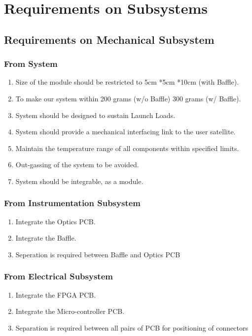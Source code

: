 \documentclass[../../main.tex]{subfiles}
\begin{document}
\chapter{Requirements on Subsystems}
\thispagestyle{fancy}

\section{Requirements on Mechanical Subsystem}
\subsection{From System}
\begin{enumerate}
        \item Size of the module should be restricted to 5cm *5cm *10cm (with Baffle).
        \item To make our system within 200 grams (w/o Baffle) 300 grams (w/ Baffle).
        \item System should be designed to sustain Launch Loads.
        \item System should provide a mechanical interfacing link to the user satellite.
        \item Maintain the temperature range of all components within specified limits.
        \item Out-gassing of the system to be avoided.
        \item System should be integrable, as a module.
    \end{enumerate}
\subsection{From Instrumentation Subsystem}
\begin{enumerate}
        \item Integrate the Optics PCB.
        \item Integrate the Baffle.
        \item Seperation is required between Baffle and Optics PCB
    \end{enumerate} 
\subsection{From Electrical Subsystem}
\begin{enumerate}
        \item Integrate the FPGA PCB.
        \item Integrate the Micro-controller PCB.
        \item Separation is required between all pairs of PCB for positioning of connectors
    \end{enumerate}
\end{document}
